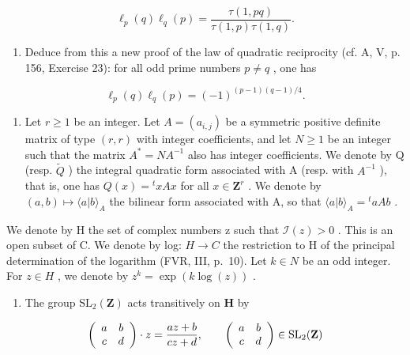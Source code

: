 \[
\ell_ {p} (q) \ell_ {q} (p) = \frac {\tau (1 , p q)}{\tau (1 , p) \tau (1 , q)}.
\]

\begin{enumerate}
\def\labelenumi{\alph{enumi})}
\setcounter{enumi}{6}
\tightlist
\item
  Deduce from this a new proof of the law of quadratic reciprocity (cf. A, V, p. 156, Exercise 23): for all odd prime numbers \(p \neq q\) , one has
\end{enumerate}

\[
\ell_ {p} (q) \ell_ {q} (p) = (- 1) ^ {(p - 1) (q - 1) / 4}.
\]

\begin{enumerate}
\def\labelenumi{\arabic{enumi})}
\setcounter{enumi}{60}
\tightlist
\item
  Let \(r \geqslant 1\) be an integer. Let \(A = (a_{i,j})\) be a symmetric positive definite matrix of type \((r, r)\) with integer coefficients, and let \(N \geqslant 1\) be an integer such that the matrix \(A^* = NA^{-1}\) also has integer coefficients. We denote by Q (resp. \(\widetilde{Q}\) ) the integral quadratic form associated with A (resp. with \(A^{-1}\) ), that is, one has \(Q(x) = {}^t xAx\) for all \(x \in \mathbf{Z}^r\) . We denote by \((a, b) \mapsto \langle a|b \rangle_A\) the bilinear form associated with A, so that \(\langle a|b \rangle_A = {}^t aAb\) .
\end{enumerate}

We denote by H the set of complex numbers z such that \(\mathcal{I}(z)>0\) . This is an open subset of C. We denote by log: \(H\to C\) the restriction to H of the principal determination of the logarithm (FVR, III, p.~10). Let \(k\in N\) be an odd integer. For \(z\in H\) , we denote by \(z^{k}=\exp(k\log(z))\) .

\begin{enumerate}
\def\labelenumi{\alph{enumi})}
\tightlist
\item
  The group \(\mathrm{SL}_2(\mathbf{Z})\) acts transitively on \(\mathbf{H}\) by
\end{enumerate}

\[
\left( \begin{array}{c c} a & b \\ c & d \end{array} \right) \cdot z = \frac {a z + b}{c z + d}, \qquad \left( \begin{array}{c c} a & b \\ c & d \end{array} \right) \in \mathrm{SL} _ {2} (\mathbf {Z})
\]

